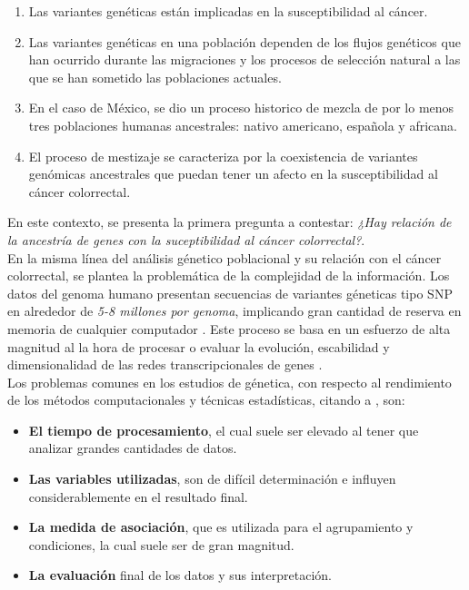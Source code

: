\begin{enumerate}[(1)]
\item Las variantes gen\'eticas est\'an implicadas en la susceptibilidad al c\'ancer.
\item Las variantes gen\'eticas en una poblaci\'on dependen de los flujos gen\'eticos que han ocurrido durante las migraciones y los procesos de selecci\'on natural a las que se han sometido las poblaciones actuales.
\item En el caso de M\'exico, se dio un proceso historico de mezcla de por lo menos tres poblaciones humanas ancestrales: nativo americano, española y africana.
\item El proceso de mestizaje se caracteriza por la coexistencia de variantes gen\'omicas ancestrales que puedan tener un afecto en la susceptibilidad al c\'ancer colorrectal.
\end{enumerate}

En este contexto, se presenta la primera pregunta a contestar: \textit{¿Hay relación de la ancestr\'ia de genes con la suceptibilidad al c\'ancer colorrectal?}.\\


En la misma línea del análisis génetico poblacional y su relación con el cáncer colorrectal, se plantea la problem\'atica de la complejidad de la información. Los datos del genoma humano presentan secuencias de variantes g\'eneticas tipo SNP en  alrededor de \textit{5-8 millones por genoma}, implicando gran cantidad de reserva en memoria de cualquier computador \cite{Beatriz}. Este proceso se basa en un esfuerzo de alta magnitud al la hora de procesar o evaluar la evolución, escabilidad y dimensionalidad de las redes transcripcionales de genes \cite{Paulino}.\\

Los problemas comunes en los estudios de génetica, con respecto al rendimiento de los métodos computacionales y técnicas estadísticas, citando a \cite{Domingo}, son:\\

\begin{itemize}
\item \textbf{El tiempo de procesamiento}, el cual suele ser elevado al tener que analizar grandes cantidades de datos.
\item \textbf{Las variables utilizadas}, son de difícil determinación e influyen considerablemente en el resultado final.
\item \textbf{La medida de asociación}, que es utilizada para el agrupamiento y condiciones, la cual suele ser de gran magnitud. 
\item \textbf{La evaluación} final de los datos y sus interpretación.
\end{itemize}\\

